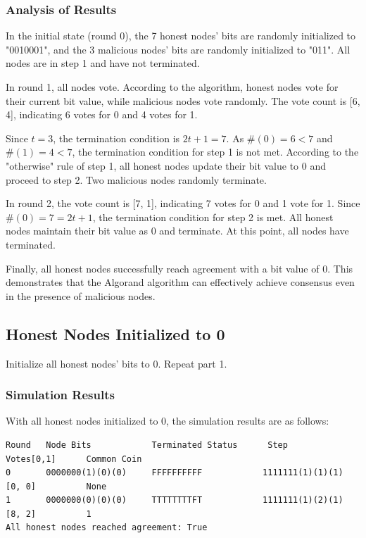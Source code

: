 \documentclass[12pt,a4paper]{article}
\begin{document}
\subsubsection{Analysis of Results}

In the initial state (round 0), the 7 honest nodes' bits are randomly initialized to "0010001", and the 3 malicious nodes' bits are randomly initialized to "011". All nodes are in step 1 and have not terminated.

In round 1, all nodes vote. According to the algorithm, honest nodes vote for their current bit value, while malicious nodes vote randomly. The vote count is [6, 4], indicating 6 votes for 0 and 4 votes for 1.

Since $t=3$, the termination condition is $2t+1 = 7$. As $\#(0)=6 < 7$ and $\#(1)=4 < 7$, the termination condition for step 1 is not met. According to the "otherwise" rule of step 1, all honest nodes update their bit value to 0 and proceed to step 2. Two malicious nodes randomly terminate.

In round 2, the vote count is [7, 1], indicating 7 votes for 0 and 1 vote for 1. Since $\#(0)=7 = 2t+1$, the termination condition for step 2 is met. All honest nodes maintain their bit value as 0 and terminate. At this point, all nodes have terminated.

Finally, all honest nodes successfully reach agreement with a bit value of 0. This demonstrates that the Algorand algorithm can effectively achieve consensus even in the presence of malicious nodes.

\subsection{Honest Nodes Initialized to 0}

Initialize all honest nodes' bits to 0. Repeat part 1.

\subsubsection{Simulation Results}

With all honest nodes initialized to 0, the simulation results are as follows:

\begin{verbatim}
Round   Node Bits            Terminated Status      Step                Votes[0,1]      Common Coin
0       0000000(1)(0)(0)     FFFFFFFFFF            1111111(1)(1)(1)    [0, 0]          None
1       0000000(0)(0)(0)     TTTTTTTTFT            1111111(1)(2)(1)    [8, 2]          1
All honest nodes reached agreement: True
\end{verbatim}
\end{document}
